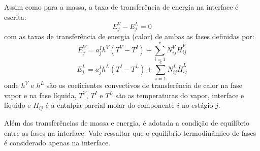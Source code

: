 
Assim como para a massa, a taxa de transferência de energia na interface é escrita:
\begin{equation}
E^V_j -  E^L_j = 0
\label{eq:balancofluxoenergia}
\end{equation}
com as taxas de transferência de energia (calor) de ambas as fases definidas por:
\begin{equation}
E^V_j = a_j^I h^V \left( T^V - T^I\right) + \sum^c_{i=1} N^V_{ij}
\overline{H}^V_{ij}
\label{eq:taxaevj}
\end{equation}
\begin{equation}
E^L_j = a_j^I h^L \left( T^I - T^L\right) + \sum^c_{i=1} N^L_{ij}
\overline{H}^L_{ij}
\label{eq:taxaelj}
\end{equation}
onde $h^V$ e $h^L$ são os coeficientes convectivos de transferência de calor na fase vapor e na fase líquida,
$T^V$, $T^I$ e $T^L$ são as
temperaturas do vapor, interface e líquido e $\overline{H}_{ij}$ é a entalpia parcial molar do componente $i$ no estágio $j$.

Além das transferências de massa e energia, é adotada a condição de equilíbrio entre as fases na interface.
Vale ressaltar que o equilíbrio
termodinâmico de fases é considerado apenas na interface.

